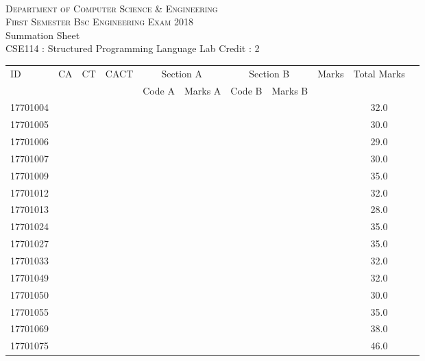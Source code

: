 \documentclass[12pt]{article}
\begin{document}
    \centering
    \begin{minipage}[m]{.8\textwidth} \centering 
	\smallskip
	\\
	\textsc{Department of Computer Science \& Engineering}\\
	\textsc{ First Semester Bsc Engineering Exam 2018}\\
    {\large {\sc Summation Sheet}}\\  
     {\centering CSE114 : Structured Programming Language Lab     Credit : 2 } \\
    \end{minipage} 
    \begin{center} 
	\renewcommand{\arraystretch}{1.08}
	\begin{small}
    \begin{tabular}{|l|c|c|c|c|c|c|c|c|c|c|} \hline
	\multirow{2}{*}{ID} & 	\multirow{2}{*}{CA}  & 	\multirow{2}{*}{CT}  & 	\multirow{2}{*}{CACT}  & \multicolumn{2 }{c|}{Section A}& \multicolumn{2 }{c|}{Section B} & 	\multirow{2}{*}{Marks}  & 	\multirow{2}{*}{Total Marks}  \\ 
	&  &  &  & Code A & Marks A & Code B & Marks B&  &  \\ \hline
17701004 &  &  &  &  &  &  &  &  & 32.0\\ \hline 
17701005 &  &  &  &  &  &  &  &  & 30.0\\ \hline 
17701006 &  &  &  &  &  &  &  &  & 29.0\\ \hline 
17701007 &  &  &  &  &  &  &  &  & 30.0\\ \hline 
17701009 &  &  &  &  &  &  &  &  & 35.0\\ \hline 
17701012 &  &  &  &  &  &  &  &  & 32.0\\ \hline 
17701013 &  &  &  &  &  &  &  &  & 28.0\\ \hline 
17701024 &  &  &  &  &  &  &  &  & 35.0\\ \hline 
17701027 &  &  &  &  &  &  &  &  & 35.0\\ \hline 
17701033 &  &  &  &  &  &  &  &  & 32.0\\ \hline 
17701049 &  &  &  &  &  &  &  &  & 32.0\\ \hline 
17701050 &  &  &  &  &  &  &  &  & 30.0\\ \hline 
17701055 &  &  &  &  &  &  &  &  & 35.0\\ \hline 
17701069 &  &  &  &  &  &  &  &  & 38.0\\ \hline 
17701075 &  &  &  &  &  &  &  &  & 46.0\\ \hline 

\end{tabular}
\end{small}
\end{center}
\end{document}
